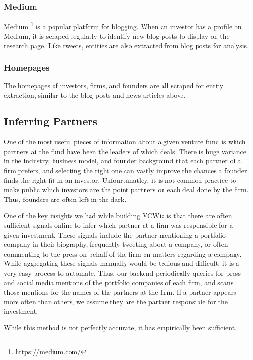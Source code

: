 \subsubsection{Medium}

Medium \footnote{https://medium.com/} is a popular platform for blogging. When an investor has a profile on Medium, it is scraped regularly to identify new blog posts to display on the research page. Like tweets, entities are also extracted from blog posts for analysis.

\subsubsection{Homepages}

The homepages of investors, firms, and founders are all scraped for entity extraction, similar to the blog posts and news articles above.

\subsection{Inferring Partners}

One of the most useful pieces of information about a given venture fund is which partners at the fund have been the leaders of which deals. There is huge variance in the industry, business model, and founder background that each partner of a firm prefers, and selecting the right one can vastly improve the chances a founder finds the right fit in an investor. Unfourtunatley, it is not common practice to make public which investors are the point partners on each deal done by the firm. Thus, founders are often left in the dark.

One of the key insights we had while building VCWiz is that there are often sufficient signals online to infer which partner at a firm was responsible for a given investment. These signals include the partner mentioning a portfolio company in their biography, frequently tweeting about a company, or often commenting to the press on behalf of the firm on matters regarding a company. While aggregating these signals manually would be tedious and difficult, it is a very easy process to automate. Thus, our backend periodically queries for press and social media mentions of the portfolio companies of each firm, and scans those mentions for the names of the partners at the firm. If a partner appears more often than others, we assume they are the partner responsible for the investment.

While this method is not perfectly accurate, it has empirically been sufficient.

